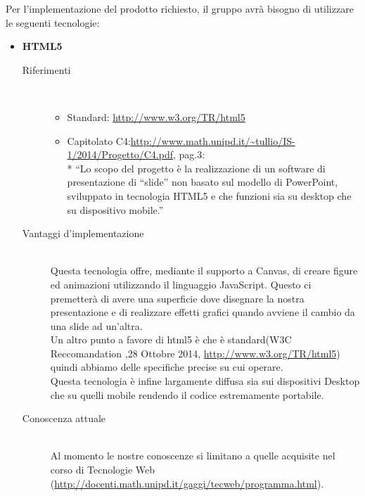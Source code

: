 Per l’implementazione del prodotto richiesto, il gruppo avrà bisogno di utilizzare le seguenti tecnologie:
\begin{itemize}
	\item \textbf{HTML5}
	\begin{description}
		\item[Riferimenti] \hfill \\
		\begin{itemize}
			\item Standard: \url{http://www.w3.org/TR/html5}
			\item Capitolato C4:\url{http://www.math.unipd.it/~tullio/IS-1/2014/Progetto/C4.pdf}, pag.3:\\*
“Lo scopo del progetto è la realizzazione di un software di presentazione di “slide” non basato sul modello di PowerPoint, sviluppato in tecnologia HTML5 e che funzioni sia su desktop che su dispositivo mobile.”
		\end{itemize}
		\item[Vantaggi d'implementazione] \hfill \\ Questa tecnologia offre, mediante il supporto a Canvas, di creare figure ed animazioni  utilizzando il linguaggio JavaScript. Questo ci premetterà di avere una superficie dove disegnare la nostra presentazione e di realizzare effetti grafici quando avviene il cambio da una slide ad un’altra. \\ Un altro punto a favore di html5 è che è standard(W3C Reccomandation ,28 Ottobre 2014, \url{http://www.w3.org/TR/html5}) quindi abbiamo delle specifiche precise su cui operare. \\ Questa tecnologia è infine largamente diffusa sia sui dispositivi Desktop che  su quelli mobile rendendo il codice estremamente portabile.

	\item[Conoscenza attuale] \hfill \\	Al momento le nostre conoscenze si limitano a quelle acquisite nel corso di Tecnologie Web (\url{http://docenti.math.unipd.it/gaggi/tecweb/programma.html}).


\end{description}
\end{itemize}
